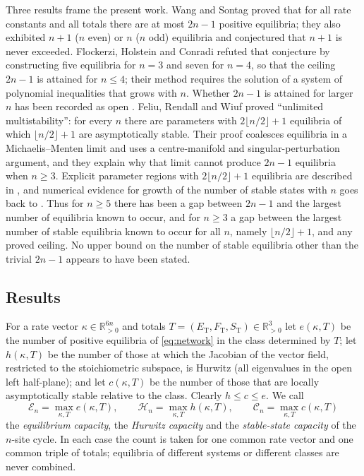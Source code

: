 \documentclass[11pt]{article}
\theoremstyle{plain}
\theoremstyle{definition}
\theoremstyle{remark}
\numberwithin{equation}{section}
\newcommand{\R}{\mathbb R}
\newcommand{\ET}{E_{\mathrm T}}
\newcommand{\FT}{F_{\mathrm T}}
\newcommand{\ST}{S_{\mathrm T}}
\newcommand{\capE}{\mathcal E_n}
\newcommand{\capH}{\mathcal H_n}
\newcommand{\capC}{\mathcal C_n}
\begin{document}
Three results frame the present work. Wang and Sontag \cite{WangSontag2008} proved that for all
rate constants and all totals there are at most \(2n-1\) positive equilibria; they also
exhibited \(n+1\) (\(n\) even) or \(n\) (\(n\) odd) equilibria and conjectured that \(n+1\) is
never exceeded. Flockerzi, Holstein and Conradi \cite{FHC2014} refuted that conjecture by
constructing five equilibria for \(n=3\) and seven for \(n=4\), so that the ceiling \(2n-1\) is
attained for \(n\le4\); their method requires the solution of a system of polynomial
inequalities that grows with \(n\). Whether \(2n-1\) is attained for larger \(n\) has been
recorded as open \cite{FRW2020,FKdWY2023}. Feliu, Rendall and Wiuf \cite{FRW2020} proved
``unlimited multistability'': for every \(n\) there are parameters with
\(2\lfloor n/2\rfloor+1\) equilibria of which \(\lfloor n/2\rfloor+1\) are asymptotically
stable. Their proof coalesces equilibria in a Michaelis--Menten limit and uses a
centre-manifold and singular-perturbation argument, and they explain why that limit cannot
produce \(2n-1\) equilibria when \(n\ge3\). Explicit parameter regions with
\(2\lfloor n/2\rfloor+1\) equilibria are described in \cite{GRPD2019}, and numerical evidence
for growth of the number of stable states with \(n\) goes back to
\cite{ThomsonGunawardena2009}. Thus for \(n\ge5\) there has been a gap between \(2n-1\) and the
largest number of equilibria known to occur, and for \(n\ge3\) a gap between the largest number
of stable equilibria known to occur for all \(n\), namely \(\lfloor n/2\rfloor+1\), and any
proved ceiling. No upper bound on the number of stable equilibria other than the trivial
\(2n-1\) appears to have been stated.

\subsection{Results}
For a rate vector \(\kappa\in\R^{6n}_{>0}\) and totals \(T=(\ET,\FT,\ST)\in\R^3_{>0}\) let
\(e(\kappa,T)\) be the number of positive equilibria of \eqref{eq:network} in the class
determined by \(T\); let \(h(\kappa,T)\) be the number of those at which the Jacobian of the
vector field, restricted to the stoichiometric subspace, is Hurwitz (all eigenvalues in the open
left half-plane); and let \(c(\kappa,T)\) be the number of those that are locally
asymptotically stable relative to the class. Clearly \(h\le c\le e\). We call
\[
 \capE=\max_{\kappa,T}e(\kappa,T),\qquad
 \capH=\max_{\kappa,T}h(\kappa,T),\qquad
 \capC=\max_{\kappa,T}c(\kappa,T)
\]
the \emph{equilibrium capacity}, the \emph{Hurwitz capacity} and the \emph{stable-state
capacity} of the \(n\)-site cycle. In each case the count is taken for one common rate vector
and one common triple of totals; equilibria of different systems or different classes are never
combined.
\end{document}

